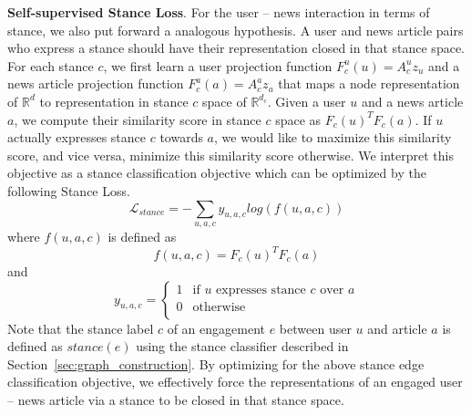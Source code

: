 \documentclass[fyp]{socreport}
\theoremstyle{definition}
\theoremstyle{hypothesis}
\begin{document}
\textbf{Self-supervised Stance Loss}.
For the user -- news interaction in terms of stance, we also put forward a analogous hypothesis. A user and news article pairs who express a stance should have their representation closed in that stance space. For each stance $c$, we first learn a user projection function $F^u_c(u) = A^u_c z_u$ and a news article projection function $F^a_c(a) = A^a_c z_a$ that maps a node representation of $\mathbb{R}^d$ to representation in stance $c$ space of $\mathbb{R}^{d_c}$. Given a user $u$ and a news article $a$, we compute their similarity score in stance $c$ space as $F_c(u)^T F_c(a)$. If $u$ actually expresses stance $c$ towards $a$, we would like to maximize this similarity score, and vice versa, minimize this similarity score otherwise. We interpret this objective as a stance classification objective which can be optimized by the following Stance Loss.
\begin{equation}
    \mathcal{L}_{stance} = -\sum_{u,a,c} y_{u,a,c} log(f(u,a,c))
\end{equation}
where $f(u,a,c)$ is defined as
\begin{equation}
    f(u,a,c) = F_c(u)^T F_c(a)
\end{equation}
and
\[  y_{u,a,c} = \left\{
\begin{array}{ll}
      1 & \textrm{if } u \textrm{ expresses stance } c \textrm{ over } a \\
      0 & \textrm{otherwise} \\
\end{array} 
\right. \]
Note that the stance label $c$ of an engagement $e$ between user $u$ and article $a$ is defined as $stance(e)$ using the stance classifier described in Section~\ref{sec:graph_construction}. By optimizing for the above stance edge classification objective, we effectively force the representations of an engaged user -- news article via a stance to be closed in that stance space.
\end{document}
